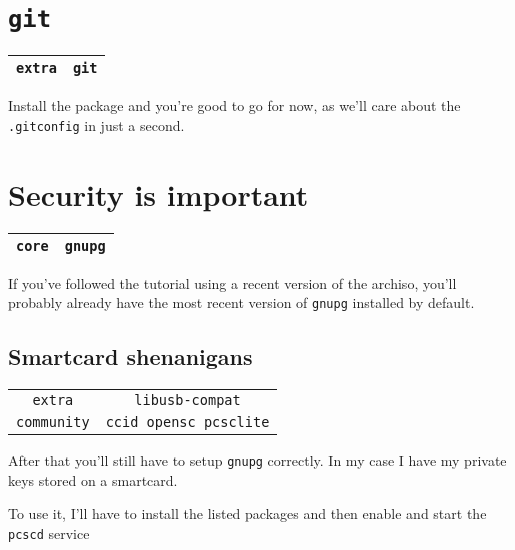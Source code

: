 \documentclass[9pt]{report}
\begin{document}
\hypertarget{x-git}{\section{\texttt{git}}}
\begin{center}
\begin{tabular}{|c|c|}
\hline
\texttt{extra} & \texttt{git} \\ 
\hline
\end{tabular}
\end{center}

Install the package and you’re good to go for now, as we’ll care about the \texttt{.gitconfig} in just a second.



\vfill\eject

\hypertarget{x-security-is-important}{\section{Security is important}}
\begin{center}
\begin{tabular}{|c|c|}
\hline
\texttt{core} & \texttt{gnupg} \\ 
\hline
\end{tabular}
\end{center}

If you’ve followed the tutorial using a recent version of the archiso, you’ll probably already have the most recent version of \texttt{gnupg} installed by default.



\vfill\eject

\hypertarget{x-smartcard-shenanigans}{\subsection{Smartcard shenanigans}}
\begin{center}
\begin{tabular}{|c|c|}
\hline
\texttt{extra} & \texttt{libusb-compat} \\ 
\texttt{community} & \texttt{ccid opensc pcsclite} \\ 
\hline
\end{tabular}
\end{center}

After that you’ll still have to setup \texttt{gnupg} correctly.
In my case I have my private keys stored on a smartcard.


To use it, I’ll have to install the listed packages and then enable and start the \texttt{pcscd} service
\end{document}
